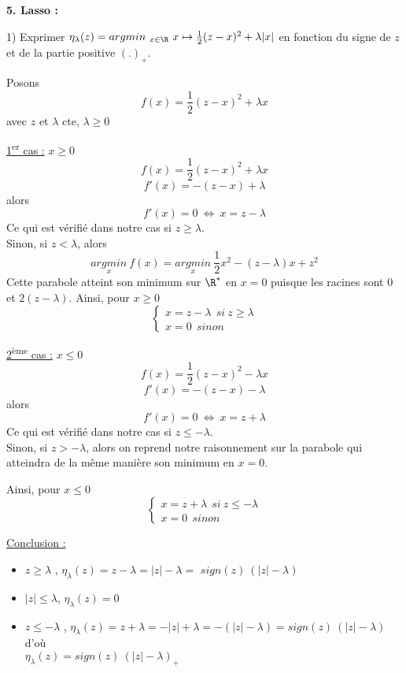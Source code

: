 \vspace{5mm}

{\fontsize{12pt}{22pt} \textbf{5. Lasso :}\par}

\vspace{5mm}

1) Exprimer $\eta_{\lambda}(z) = arg min_{\ x \in \R} \ x \mapsto \frac{1}{2}(z-x)^2 + \lambda|x|$ en fonction du signe de $z$ et de la partie positive $(.)_{+}$.

\bigskip
Posons 
$$f(x) = \frac{1}{2}(z-x)^2 + \lambda x$$ 
avec $z$ et $\lambda$ cte, $\lambda \geqslant 0$
\medskip

\underline{1\textsuperscript{er} cas :} $x \geqslant 0$ 
   $$f(x) = \frac{1}{2}(z-x)^2 + \lambda x$$
   $$f'(x)= -(z-x) + \lambda$$
alors $$f'(x) = 0 \ \Leftrightarrow \ x = z - \lambda$$
Ce qui est vérifié dans notre cas si $z \geqslant \lambda$. \\
Sinon, si $z < \lambda$, alors 
$$\underset{x}{argmin} \ f(x) = \underset{x}{argmin} \ \frac{1}{2} x^2 - (z-\lambda)x + z^2$$
Cette parabole atteint son minimum sur $\R^*$ en $x = 0$ puisque les racines sont $0$ et $2(z-\lambda)$.
\smallskip
Ainsi, pour $x \geqslant 0$
$$\begin{cases}
    x = z - \lambda \ \ si \ z \geqslant \lambda \\
    x = 0 \ \ sinon
\end{cases}$$


\underline{2\textsuperscript{ème} cas :} $x \leqslant 0$ 
   $$f(x) = \frac{1}{2}(z-x)^2 - \lambda x$$
   $$f'(x)= -(z-x) - \lambda$$
alors $$f'(x) = 0 \ \Leftrightarrow \ x = z + \lambda$$
Ce qui est vérifié dans notre cas si $z \leqslant - \lambda$. \\
Sinon, si $z > - \lambda$, alors on reprend notre raisonnement sur la parabole qui atteindra de la même manière son minimum en $x=0$.

\smallskip
Ainsi, pour $x \leqslant 0$
$$\begin{cases}
    x = z + \lambda \ \ si \ z \leqslant - \lambda \\
    x = 0 \ \ sinon
\end{cases}$$

\bigskip

\underline{Conclusion :} 
\begin{itemize}
    \item \boldmath $z \geqslant \lambda$ \unboldmath, $ \eta_{\lambda}(z) = z - \lambda = |z| - \lambda = $ \boldmath $sign(z) \ (|z| - \lambda) $ \unboldmath
    \item \boldmath $|z| \leqslant \lambda$, $ \eta_{\lambda}(z) = 0$ \unboldmath
    \item \boldmath $z \leqslant - \lambda$ \unboldmath, $\eta_{\lambda}(z) = z + \lambda = - |z| + \lambda = - (|z| - \lambda) = sign(z) \ (|z| - \lambda)$ d'où \\ \boldmath $\eta_{\lambda}(z) = sign(z) \ (|z| - \lambda)_{+}$ \unboldmath 
\end{itemize}

